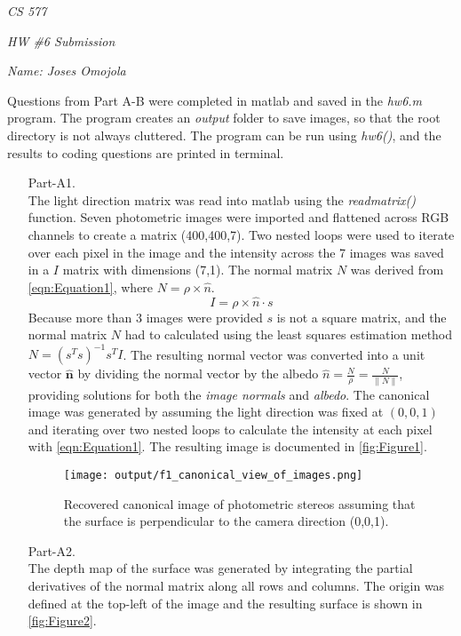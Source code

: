 \documentclass[12pt]{report}
\begin{document}
\centerline{\it CS 577}
\centerline{\it HW \#6 Submission}
\centerline{\it Name: Joses Omojola}

Questions from Part A-B were completed in matlab and saved in the \emph{hw6.m} program. The program creates an \emph{output} folder to save images, 
so that the root directory is not always cluttered. The program can be run using \textit{hw6()}, and the results to coding 
questions are printed in terminal.

\begin{enumerate}

    \item[Part-A1.]
    \ \\
    The light direction matrix was read into matlab using the \emph{readmatrix()} function. Seven photometric images were imported and flattened across 
    RGB channels to create a matrix (400,400,7). Two nested loops were used to iterate over each pixel in the image and the intensity across the 7 images 
    was saved in a $I$ matrix with dimensions (7,1). The normal matrix $N$ was derived from \autoref{eqn:Equation1}, where $N=\rho \times \hat{n}$.
    \begin{equation}
    \tag{1}
    I = \rho \times \hat{n} \cdot s
    \label{eqn:Equation1}
    \end{equation}
    Because more than 3 images were provided $s$ is not a square matrix, and the normal matrix $N$ had to calculated using the least squares estimation method 
    $N = (s^T s)^{-1} s^T I$. The resulting normal vector was converted into a unit vector $\mathbf{\hat{n}}$ by dividing the normal vector by the albedo 
    $\hat{n} = \frac{N}{\rho} = \frac{N}{\lVert N \rVert}$, providing solutions for both the \emph{image normals} and \emph{albedo}. The canonical image was 
    generated by assuming the light direction was fixed at $(0,0,1)$ and iterating over two nested loops to calculate the intensity at each pixel with 
    \autoref{eqn:Equation1}. The resulting image is documented in \autoref{fig:Figure1}.

    \begin{figure}[H]
        \centering
        \texttt{[image: output/f1\_canonical\_view\_of\_images.png]}
        \caption{Recovered canonical image of photometric stereos assuming that the surface is perpendicular to the camera direction (0,0,1).}
        \label{fig:Figure1}
    \end{figure}

    \FloatBarrier 

    \item[Part-A2.]
    \ \\
    The depth map of the surface was generated by integrating the partial derivatives of the normal matrix along all rows and columns. The origin was defined 
    at the top-left of the image and the resulting surface is shown in \autoref{fig:Figure2}.


\end{enumerate}
\end{document}
